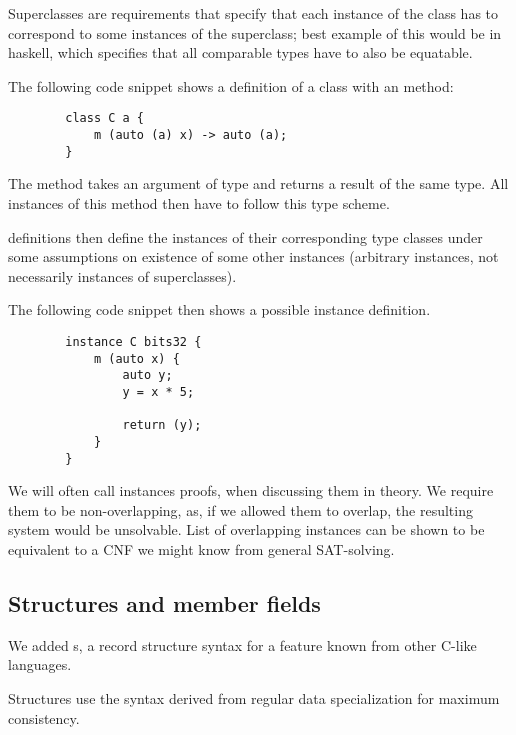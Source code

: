 Superclasses are requirements that specify that each instance of the class has to correspond to some instances of the superclass; best example of this would be  in haskell, which specifies that all comparable types have to also be equatable.

\begin{ex}[Classes]
    The following code snippet shows a definition of a  class with an  method:

    \begin{lstlisting}
        class C a {
            m (auto (a) x) -> auto (a);
        }
    \end{lstlisting}

    The  method takes an argument of type  and returns a result of the same type. All instances of this method then have to follow this type scheme.
\end{ex}

 definitions then define the instances of their corresponding type classes under some assumptions on existence of some other instances (arbitrary instances, not necessarily instances of superclasses).

\begin{ex}[Instance]
    The following code snippet then shows a possible instance definition.

    \begin{lstlisting}
        instance C bits32 {
            m (auto x) {
                auto y;
                y = x * 5;

                return (y);
            }
        }
    \end{lstlisting}
\end{ex}

We will often call instances proofs, when discussing them in theory. We require them to be non-overlapping, as, if we allowed them to overlap, the resulting system would be unsolvable. List of overlapping instances can be shown to be equivalent to a CNF we might know from general SAT-solving.

\subsection{Structures and member fields}

We added s, a record structure syntax for a feature known from other C-like languages.

Structures use the syntax derived from regular data specialization for maximum consistency.

